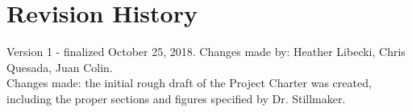 \author{Project Charter \\ \vspace{0.6in}
\vspace{12pt} 

Heather Libecki - Chris Quesada - Juan Colin \\
\vspace{5pt}
Technical Advisor: Dr. Hovannes Kulhandjian	\\				%
\vspace{12pt} 								%
Friday, October 26, 2018 \\ 
\vspace{3.2in}
ECE 186A - Senior Design I \\ 					%
Fall 2018 - Dr. Aaron Stillmaker \\
\vspace{5pt}
California State University, Fresno \\
Electrical and Computer Engineering Department \\ 

\vspace{2in}								%


\vspace{4in}}								%




\maketitle									%
\thispagestyle{empty}						%
\newpage
\thispagestyle{empty}
\tableofcontents

\listoffigures

\listoftables

\newpage
\thispagestyle{empty} 
 \section*{Revision History}
	Version 1 - finalized October 25, 2018. Changes made by: Heather Libecki, Chris Quesada, Juan Colin. \\
	Changes made: the initial rough draft of the Project Charter was created, including the proper sections and figures specified by Dr. Stillmaker.
 
